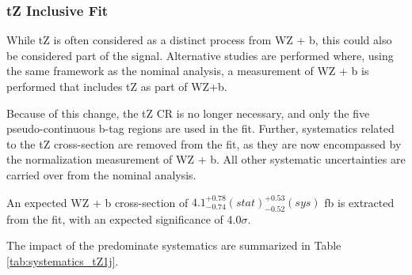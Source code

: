 
\subsubsection{tZ Inclusive Fit}
\label{sec:inc_tZ}

While tZ is often considered as a distinct process from WZ + b, this could also be considered part of the signal. Alternative studies are performed where, using the same framework as the nominal analysis, a measurement of WZ + b is performed that includes tZ as part of WZ+b. 

Because of this change, the tZ CR is no longer necessary, and only the five pseudo-continuous b-tag regions are used in the fit. Further, systematics related to the tZ cross-section are removed from the fit, as they are now encompassed by the normalization measurement of WZ + b. All other systematic uncertainties are carried over from the nominal analysis.



An expected WZ + b cross-section of $4.1^{+0.78}_{-0.74} (stat)^{+0.53}_{-0.52}(sys)$ fb is extracted from the fit, with an expected significance of 4.0$\sigma$.

The impact of the predominate systematics are summarized in Table \ref{tab:systematics_tZ1j}.

